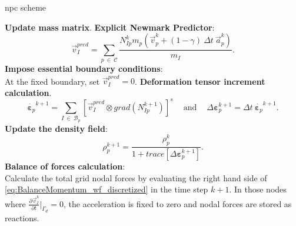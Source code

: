 \documentclass[preprint,12pt,a4paper]{elsarticle}
\newcommand{\tens}[1]{
  \ensuremath{\mathbf{{#1}}}
}
\newcommand\Grad[1]{grad({#1})}
\newcommand{\Deriv}[3][]{
  \ensuremath{\frac{\partial^{#1}{#2}}{ \partial {#3}^{#1} }}
}
\begin{document}
\begin{algorithm}
  \renewcommand{\thealgorithm}{}
  \caption{\acrfull{npc} scheme} \label{algo:1}
  \begin{algorithmic}[1]
    \STATE \textbf{Update mass matrix}.
    \STATE \textbf{Explicit Newmark Predictor}:\\
    \begin{equation*}
      \vec{v}_I^{pred} = \sum_{p\ \in\ \mathcal{C}} \frac{ N_{Ip}^{k} m_p (\vec{v}_p^k + (1 - \gamma)\ \Delta t\ \vec{a}_p^k)}{m_I}.
    \end{equation*}
    \STATE \textbf{Impose essential boundary conditions}:\\
    At the fixed boundary, set $\vec{v}_{I}^{pred} = 0$. 
    \STATE \textbf{Deformation tensor increment calculation}.
    \begin{equation*}
      \dot{\tens{\varepsilon}_{p}}^{k+1} = \sum_{I\ \in\ \mathcal{B}_p} \left[ \vec{v}_{I}^{pred} \otimes \Grad{N_{Ip}^{k+1}} \right]^s\ \quad \text{and}\ \quad \Delta \tens{\varepsilon}_{p}^{k+1} = \Delta t\ \dot{\tens{\varepsilon}_{p}}^{k+1}.
    \end{equation*}
    \STATE \textbf{Update the density field}:
    \begin{equation*}
      \rho_p^{k+1} = \frac{\rho_p^k}{1 + \mathit{trace}\left[\Delta\tens{\varepsilon}_{p}^{k+1}\right]}.
    \end{equation*}
    \STATE \textbf{Balance of forces calculation}:\\
    Calculate the total grid nodal forces by evaluating the right hand side of 
    \eqref{eq:BalanceMomentum_wf_discretized} in the time step $k+1$.
    In those nodes where $\Deriv{\vec{v}_I^{k}}{t} \big\rvert_{\Gamma_d} = 0$, the acceleration is fixed to zero and nodal forces are stored as reactions.\\

\end{algorithmic}
\end{algorithm}
\end{document}
